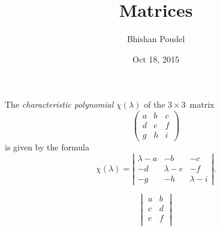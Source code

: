 \documentclass{article}
\title{Matrices}
\author{Bhishan Poudel}
\date{Oct 18, 2015}
\begin{document}
\maketitle

The \emph{characteristic polynomial} $\chi(\lambda)$ of the
$3 \times 3$~matrix
\[ \left( \begin{array}{ccc}
a & b & c \\
d & e & f \\
g & h & i \end{array} \right)\] 
is given by the formula
\[ \chi(\lambda) = \left| \begin{array}{ccc}
\lambda - a & -b & -c \\
-d & \lambda - e & -f \\
-g & -h & \lambda - i \end{array} \right|.\]

$$
\begin{vmatrix}
a&b\\
c&d\\
e&f\\
\end{vmatrix}
$$
\end{document}
